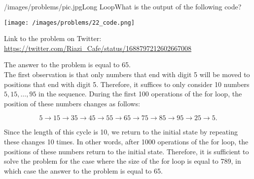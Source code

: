 \begin{problem}{/images/problems/pic.jpg}{Long Loop}What is the output of the following code?

\begin{center}
	\texttt{[image: /images/problems/22\_code.png]}
\end{center}

Link to the problem on Twitter:  \url{https://twitter.com/Riazi_Cafe/status/1688797212602667008}\end{problem}
\begin{solution}
The answer to the problem is equal to 65.\\[0.2cm]

The first observation is that only numbers that end with digit 5 will be moved to positions that end with digit 5. Therefore, it suffices to only consider 10 numbers $5, 15, \ldots, 95$ in the sequence.
During the first 100 operations of the for loop, the position of these numbers changes as follows:

$$5 \rightarrow 15 \rightarrow 35 \rightarrow 45 \rightarrow 55 \rightarrow 65 \rightarrow 75 \rightarrow 85 \rightarrow 95 \rightarrow 25 \rightarrow 5.$$

Since the length of this cycle is 10, we return to the initial state by repeating these changes 10 times. In other words, after 1000 operations of the for loop, the positions of these numbers return to the initial state. Therefore, it is sufficient to solve the problem for the case where the size of the for loop is equal to 789, in which case the answer to the problem is equal to 65.



\end{solution}
